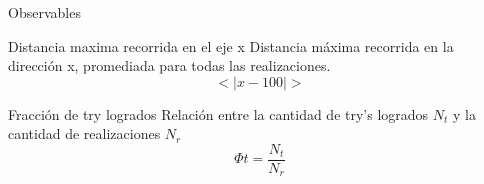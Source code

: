 \begin{frame}{Observables}
    \begin{block}{Distancia maxima recorrida en el eje x}
        Distancia máxima recorrida en la dirección x, promediada para todas las realizaciones.
        \begin{equation*}
            <|x - 100|>
        \end{equation*}
    \end{block}
    \begin{block}{Fracción de try logrados}
        Relación entre la cantidad de try's logrados $N_t$ y la cantidad de realizaciones $N_r$
        \begin{equation*}
            \Phi t = \frac{N_t}{N_r}
        \end{equation*}
    \end{block}
\end{frame}